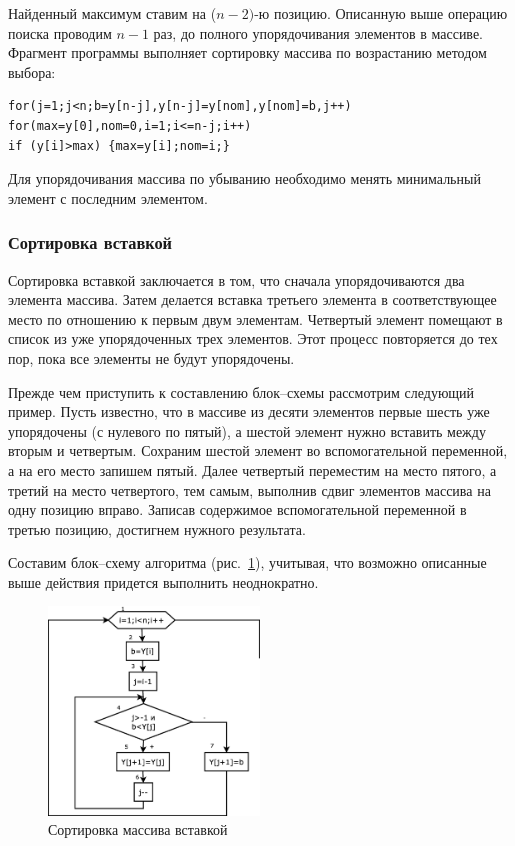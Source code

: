 Найденный максимум ставим на ($n-2)$-ю позицию. Описанную выше операцию поиска проводим
$n-1$ раз, до полного упорядочивания элементов в массиве. Фрагмент программы выполняет сортировку
массива по возрастанию методом выбора:
\begin{lstlisting}
for(j=1;j<n;b=y[n-j],y[n-j]=y[nom],y[nom]=b,j++)
for(max=y[0],nom=0,i=1;i<=n-j;i++) 
if (y[i]>max) {max=y[i];nom=i;}
\end{lstlisting}

Для упорядочивания массива по убыванию необходимо менять минимальный элемент с последним элементом.

\subsubsection[Сортировка вставкой]{Сортировка вставкой}
Сортировка вставкой заключается в том, что сначала упорядочиваются два элемента массива. Затем делается вставка третьего
элемента в соответствующее место по отношению к первым двум элементам. Четвертый элемент помещают в список из уже
упорядоченных трех элементов. Этот процесс повторяется до тех пор, пока все элементы не будут упорядочены. 

Прежде чем приступить к составлению блок–схемы рассмотрим следующий пример. Пусть известно, что в массиве из десяти
элементов первые шесть уже упорядочены (с нулевого по пятый), а шестой элемент нужно вставить между вторым и четвертым.
Сохраним шестой элемент во вспомогательной переменной, а на его место запишем пятый. Далее четвертый переместим на
место пятого, а третий на место четвертого, тем самым, выполнив сдвиг элементов массива на одну позицию вправо. Записав
содержимое вспомогательной переменной в третью позицию, достигнем нужного результата.

Составим блок–схему алгоритма (рис.~\ref{ch05:refDrawing13}), учитывая, что возможно описанные выше действия придется
выполнить неоднократно.

\begin{figure}[htb]
\begin{center}
\includegraphics[width=0.5\textwidth]{img/ris_5_14}
\caption{Сортировка массива вставкой}
\label{ch05:refDrawing13}
\end{center}
\end{figure}


